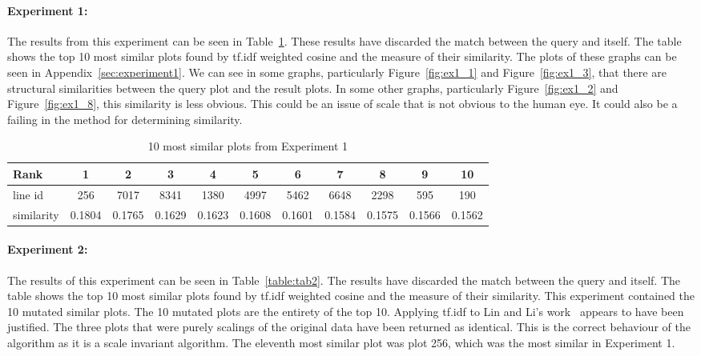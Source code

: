 \paragraph*{Experiment 1:} The results from this experiment can be seen in Table~\ref{table:tab1}.  These results have discarded the match between the query and itself.  The table shows the top 10 most similar plots found by \ac{tf.idf} weighted cosine and the measure of their similarity.  The plots of these graphs can be seen in Appendix~\ref{sec:experiment1}.  We can see in some graphs, particularly Figure~\ref{fig:ex1_1} and Figure~\ref{fig:ex1_3}, that there are structural similarities between the query plot and the result plots.  In some other graphs, particularly Figure~\ref{fig:ex1_2} and Figure~\ref{fig:ex1_8}, this similarity is less obvious.  This could be an issue of scale that is not obvious to the human eye.  It could also be a failing in the method for determining similarity.

\begin{table}[h]
\begin{center}
    \resizebox{0.65\textwidth}{!} {\begin{minipage}{\textwidth}
    \begin{tabular}{ | l | c | c | c | c | c | c | c | c | c | c | }
        \hline
        Rank & 1 & 2 & 3 & 4 & 5 & 6 & 7 & 8 & 9 & 10 \\
        \hline
        line id & 256 & 7017 & 8341 & 1380 & 4997 & 5462 & 6648 & 2298 & 595 & 190 \\
        \hline
        similarity & 0.1804 & 0.1765 & 0.1629 & 0.1623 & 0.1608 & 0.1601 & 0.1584 & 0.1575 & 0.1566 & 0.1562 \\
        \hline
    \end{tabular}
    \caption{10 most similar plots from Experiment 1}
    \label{table:tab1}
    \end{minipage}}
\end{center}
\end{table}

\paragraph*{Experiment 2:} The results of this experiment can be seen in Table~\ref{table:tab2}.  The results have discarded the match between the query and itself.  The table shows the top 10 most similar plots found by \ac{tf.idf} weighted cosine and the measure of their similarity.  This experiment contained the 10 mutated similar plots.  The 10 mutated plots are the entirety of the top 10.  Applying \ac{tf.idf} to Lin and Li's work~\cite{structural_similarity} appears to have been justified.  The three plots that were purely scalings of the original data have been returned as identical.  This is the correct behaviour of the algorithm as it is a scale invariant algorithm.  The eleventh most similar plot was plot 256, which was the most similar in Experiment 1.

